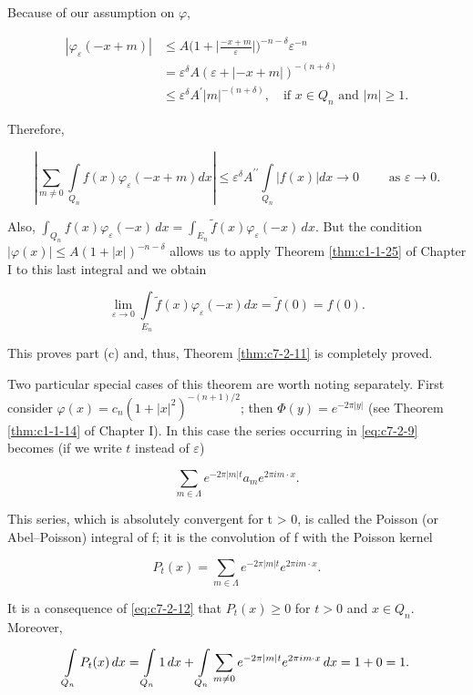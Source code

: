 Because of our assumption on $\varphi$,

\[
\begin{aligned}|\varphi_{\varepsilon}(-x+m)|&\leq A\bigg(1+\bigg|\frac{-x+m}{\varepsilon}\bigg|\bigg)^{-n-\delta}\varepsilon^{-n}\\&=\varepsilon^{\delta}A(\varepsilon+|-x+m|)^{-(n+\delta)}\\&\leq\varepsilon^{\delta}A^{\prime}|m|^{-(n+\delta)},\quad\text{if }x\in Q_{n}\text{ and }|m|\geq1.\end{aligned}
\]

Therefore,

\[
\left|\sum_{m\neq0}\int\limits_{Q_{n}}f(x)\varphi_{\varepsilon}(-x+m)d x\right|\leq\varepsilon^{\delta}A^{\prime \prime}\int\limits_{Q_{n}}\left|f(x)\right|d x\rightarrow0\qquad\text{ as }\varepsilon\rightarrow0.
\]

Also, $\int_{Q_n} f(x)\varphi_\varepsilon(-x)\,dx = \int_{E_n} \tilde{f}(x)\varphi_\varepsilon(-x)\,dx$. But the condition $|\varphi(x)| \leq A(1 + |x|)^{-n-\delta}$ allows us to apply Theorem \ref{thm:c1-1-25} of Chapter I to this last integral and we obtain

\[
\lim_{\varepsilon\to0}\int\limits_{E_{n}}\tilde{f}(x)\varphi_{\varepsilon}(-x)d x=\tilde{f}(0)=f(0).
\]

This proves part (c) and, thus, Theorem \ref{thm:c7-2-11} is completely proved.

Two particular special cases of this theorem are worth noting separately. First consider $\varphi(x) = c_n(1 + |x|^2)^{-(n+1)/2}$; then $\Phi(y) = e^{-2\pi|y|}$ (see Theorem \ref{thm:c1-1-14} of Chapter I). In this case the series occurring in \eqref{eq:c7-2-9} becomes (if we write $t$ instead of $\varepsilon$)

\begin{equation}\label{eq:c7-2-13}
\sum_{m\in\Lambda}e^{-2\pi\left|m\right|t}a_{m}e^{2\pi i m\cdot x}.
\end{equation}

This series, which is absolutely convergent for t > 0, is called the Poisson (or Abel--Poisson) integral of f; it is the convolution of f with the Poisson kernel

\[
P_{t}(x)=\sum_{m\in\Lambda}e^{-2\pi|m|t}e^{2\pi i m\cdot x}.
\]

It is a consequence of \eqref{eq:c7-2-12} that $P_t(x) \geq 0$ for $t > 0$ and $x \in Q_n$. Moreover,

\[
\intop_{Q_{n}}P_{t}(x)\,dx=\intop_{Q_{n}}1\,dx+\intop_{Q_{n}}\sum_{m\neq0}e^{-2\pi|m|t}e^{2\pi i m\cdot x}\,dx=1+0=1.
\]

